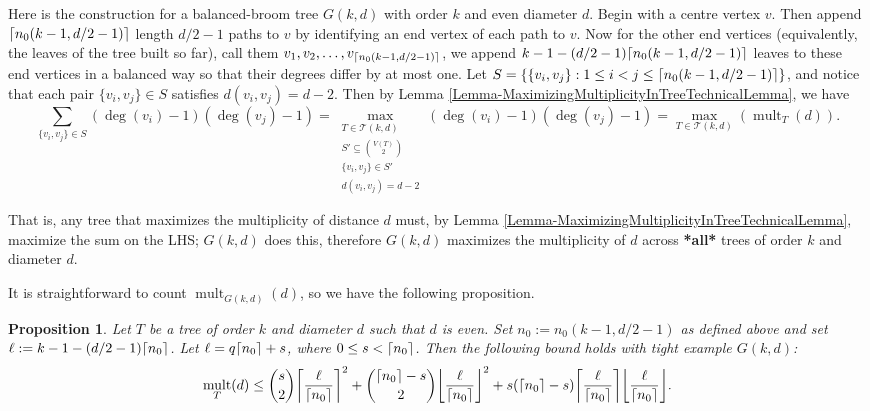 \documentclass[12]{article}
\DeclarePairedDelimiter\ceil{\lceil}{\rceil}
\DeclareMathOperator{\mult}{mult}
\newtheorem{prop}[thm]{Proposition}
\theoremstyle{definition}
\begin{document}
	Here is the construction for a balanced-broom tree $G(k,d)$ with order $k$ and even diameter $d$.  Begin with a centre vertex $v$.  Then append $\ceil{n_0(k-1,d/2-1)}$ length $d/2-1$ paths to $v$ by identifying an end vertex of each path to $v$.  Now for the other end vertices (equivalently, the leaves of the tree built so far), call them $v_1, v_2, \ldots, v_{\ceil{n_0(k-1,d/2-1)}}$, we append $k-1-(d/2-1)\ceil{n_0(k-1,d/2-1)}$ leaves to these end vertices in a balanced way so that their degrees differ by at most one.  Let $S = \{\{v_i, v_j\}: 1 \leq i<j \leq \ceil{n_0(k-1,d/2-1)} \}$, and notice that each pair $\{v_i,v_j\} \in S$ satisfies $d(v_i,v_j) = d-2$.  Then by Lemma \ref{Lemma-MaximizingMultiplicityInTreeTechnicalLemma}, we have
	$$\sum_{\{v_i,v_j\} \in S}(\deg(v_i)-1)(\deg(v_j)-1) = \max_{\substack{T \in \mathcal{T}(k,d) \\ S' \subseteq {V(T) \choose 2} \\ \{v_i,v_j\} \in S' \\ d(v_i,v_j) = d-2}} (\deg(v_i)-1)(\deg(v_j)-1) = \max_{T \in \mathcal{T}(k,d)}(\mult_T(d)).$$
	
	That is, any tree that maximizes the multiplicity of distance $d$ must, by Lemma \ref{Lemma-MaximizingMultiplicityInTreeTechnicalLemma}, maximize the sum on the LHS; $G(k,d)$ does this, therefore $G(k,d)$ maximizes the multiplicity of $d$ across \textbf{*all*} trees of order $k$ and diameter $d$.
	
	It is straightforward to count $\mult_{G(k,d)}(d)$, so we have the following proposition.
	\begin{prop}\label{Proposition-TightDiameterCounting}
		Let $T$ be a tree of order $k$ and diameter $d$ such that $d$ is even.  Set $n_0 := n_0(k-1,d/2-1)$ as defined above and set $\ell := k-1-(d/2-1)\ceil{n_0}$.  Let $\ell = q\ceil{n_0} + s$, where $0 \leq s <\ceil{n_0}$.    Then the following bound holds with tight example $G(k,d)$:
			$$\mult_T(d) \leq {s \choose 2}\biggr\lceil{\frac{\ell}{\ceil{n_0}}}\biggr\rceil^2 + {\ceil{n_0}-s \choose 2}\biggr\lfloor{\frac{\ell}{\ceil{n_0}}}\biggr\rfloor^2 + s(\ceil{n_0}-s)\biggr\lceil{\frac{\ell}{\ceil{n_0}}}\biggr\rceil \biggr\lfloor{\frac{\ell}{\ceil{n_0}}}\biggr\rfloor.$$
		
	\end{prop}
	
\end{document}
